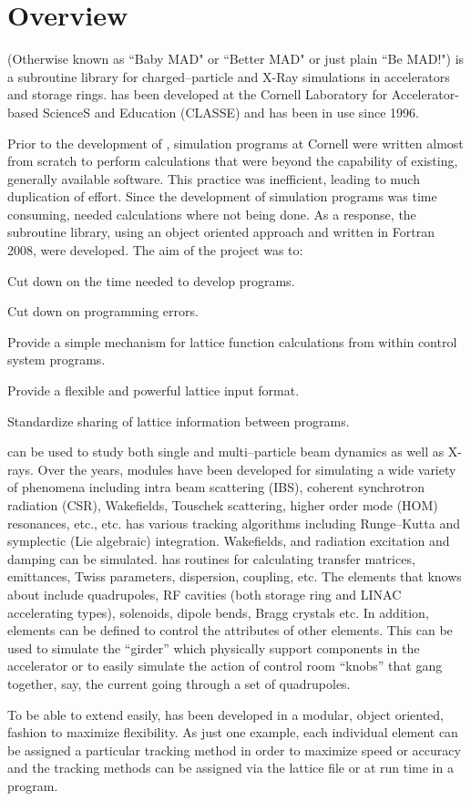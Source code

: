 \section*{Overview}

\bmad (Otherwise known as ``Baby MAD" or ``Better MAD" or just plain ``Be MAD!") is a subroutine
library for charged--particle and X-Ray simulations in accelerators and storage rings. \bmad has
been developed at the Cornell Laboratory for Accelerator-based ScienceS and Education (CLASSE) and
has been in use since 1996.

Prior to the development of \bmad, simulation programs at Cornell were written almost from scratch
to perform calculations that were beyond the capability of existing, generally available software.
This practice was inefficient, leading to much duplication of effort. Since the development of
simulation programs was time consuming, needed calculations where not being done. As a response, the
\bmad subroutine library, using an object oriented approach and written in Fortran 2008, were
developed.  The aim of the \bmad project was to:
\begin{Itemize}
\item Cut down on the time needed to develop programs.
\item Cut down on programming errors.
\item Provide a simple mechanism for lattice function calculations
from within control system programs.
\item Provide a flexible and powerful lattice input format.
\item Standardize sharing of lattice information between 
programs.
\end{Itemize}

\bmad can be used to study both single and multi--particle beam dynamics as well as X-rays.  Over
the years, \bmad modules have been developed for simulating a wide variety of phenomena including
intra beam scattering (IBS), coherent synchrotron radiation (CSR), Wakefields, Touschek scattering,
higher order mode (HOM) resonances, etc., etc.  \bmad has various tracking algorithms including
Runge--Kutta and symplectic (Lie algebraic) integration. Wakefields, and radiation excitation and
damping can be simulated. \bmad has routines for calculating transfer matrices, emittances, Twiss
parameters, dispersion, coupling, etc. The elements that \bmad knows about include quadrupoles, RF
cavities (both storage ring and LINAC accelerating types), solenoids, dipole bends, Bragg crystals
etc.  In addition, elements can be defined to control the attributes of other elements. This can be
used to simulate the ``girder'' which physically support components in the accelerator or to easily
simulate the action of control room ``knobs'' that gang together, say, the current going through a
set of quadrupoles.

To be able to extend \bmad easily, \bmad has been developed in a modular, object oriented, fashion
to maximize flexibility. As just one example, each individual element can be assigned a particular
tracking method in order to maximize speed or accuracy and the tracking methods can be assigned via
the lattice file or at run time in a program.

\vfill
\break

